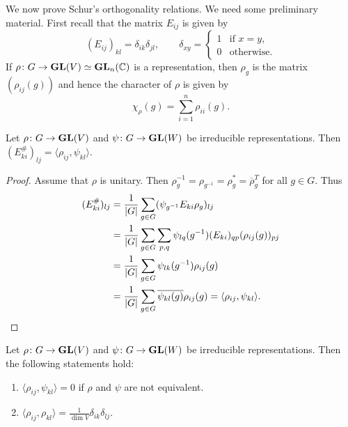 \chapter{}

We now prove Schur's orthogonality relations. We need some preliminary material. First recall that 
the matrix $E_{ij}$ is given by 
\[
(E_{ij})_{kl}=\delta_{ik}\delta_{jl},
\qquad
\delta_{xy}=\begin{cases}
    1 & \text{if $x=y$},\\
    0 & \text{otherwise}.
\end{cases}
\]
If $\rho\colon G\to\mathbf{GL}(V)\simeq\mathbf{GL}_n(\mathbb{C})$ is a representation, then
$\rho_g$ is the matrix $(\rho_{ij}(g))$ and hence the character of $\rho$ is given by
\[
\chi_\rho(g)=\sum_{i=1}^n\rho_{ii}(g).
\]

\begin{lemma}
Let $\rho\colon G\to\mathbf{GL}(V)$ and $\psi\colon G\to\mathbf{GL}(W)$ be irreducible representations. Then
$(E_{ki}^\#)_{lj}=\langle\rho_{ij},\psi_{kl}\rangle$.
\end{lemma}

\begin{proof}
  Assume that $\rho$ is unitary. Then $\rho^{-1}_g=\rho_{g^{-1}}=\rho^*_g=\overline{\rho}_g^T$ for all $g\in G$. 
  Thus  
  \begin{align*}
      (E_{ki}^\#)_{lj} &= \frac{1}{|G|}\sum_{g\in G}(\psi_{g^{-1}}E_{ki}\rho_g)_{lj}\\
      &=\frac{1}{|G|}\sum_{g\in G}\sum_{p,q}\psi_{lq}(g^{-1})(E_{ki})_{qp}(\rho_{ij}(g))_{pj}\\
      &=\frac{1}{|G|}\sum_{g\in G}\psi_{lk}(g^{-1})\rho_{ij}(g)\\
      &=\frac{1}{|G|}\sum_{g\in G}\overline{\psi_{kl}(g)}\rho_{ij}(g)=\langle \rho_{ij},\psi_{kl}\rangle.\qedhere
  \end{align*}
\end{proof}

\begin{theorem}[Schur]
    Let $\rho\colon G\to\mathbf{GL}(V)$ and $\psi\colon G\to\mathbf{GL}(W)$ be irreducible representations. 
    Then the following statements hold:
    \begin{enumerate}
        \item $\langle\rho_{ij},\psi_{kl}\rangle=0$ if $\rho$ and $\psi$ are not equivalent.
        \item $\displaystyle{\langle\rho_{ij},\rho_{kl}\rangle=\frac{1}{\dim V}\delta_{ik}\delta_{lj}}$.
    \end{enumerate}
\end{theorem}

